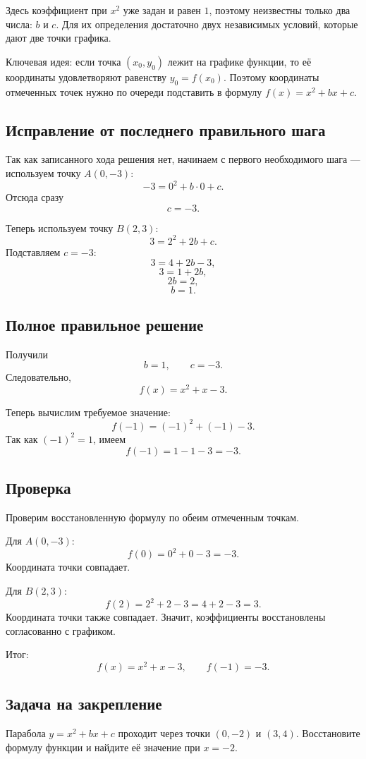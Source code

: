 \documentclass[12pt,a4paper]{article}
\begin{document}
Здесь коэффициент при \(x^2\) уже задан и равен \(1\), поэтому неизвестны только два числа: \(b\) и \(c\). Для их определения достаточно двух независимых условий, которые дают две точки графика.

\textcolor{blue!60!black}{Ключевая идея:} если точка \((x_0,y_0)\) лежит на графике функции, то её координаты удовлетворяют равенству \(y_0=f(x_0)\). Поэтому координаты отмеченных точек нужно по очереди подставить в формулу \(f(x)=x^2+bx+c\).

\subsection*{Исправление от последнего правильного шага}
Так как записанного хода решения нет, начинаем с первого необходимого шага --- используем точку \(A(0,-3)\):
\[
  -3=0^2+b\cdot0+c.
\]
Отсюда сразу
\[
  c=-3.
\]

Теперь используем точку \(B(2,3)\):
\[
  3=2^2+2b+c.
\]
Подставляем \(c=-3\):
\[
  3=4+2b-3,
\]
\[
  3=1+2b,
\]
\[
  2b=2,
\]
\[
  b=1.
\]

\subsection*{Полное правильное решение}
Получили
\[
  b=1, \qquad c=-3.
\]
Следовательно,
\[
  f(x)=x^2+x-3.
\]

Теперь вычислим требуемое значение:
\[
  f(-1)=(-1)^2+(-1)-3.
\]
Так как \((-1)^2=1\), имеем
\[
  f(-1)=1-1-3=-3.
\]

\subsection*{Проверка}
Проверим восстановленную формулу по обеим отмеченным точкам.

Для \(A(0,-3)\):
\[
  f(0)=0^2+0-3=-3.
\]
Координата точки совпадает.

Для \(B(2,3)\):
\[
  f(2)=2^2+2-3=4+2-3=3.
\]
Координата точки также совпадает. Значит, коэффициенты восстановлены согласованно с графиком.

\textcolor{teal!60!black}{Итог:}
\[
  \boxed{f(x)=x^2+x-3}, \qquad \boxed{f(-1)=-3}.
\]

\subsection*{Задача на закрепление}
Парабола \(y=x^2+bx+c\) проходит через точки \((0,-2)\) и \((3,4)\). Восстановите формулу функции и найдите её значение при \(x=-2\).
\end{document}
